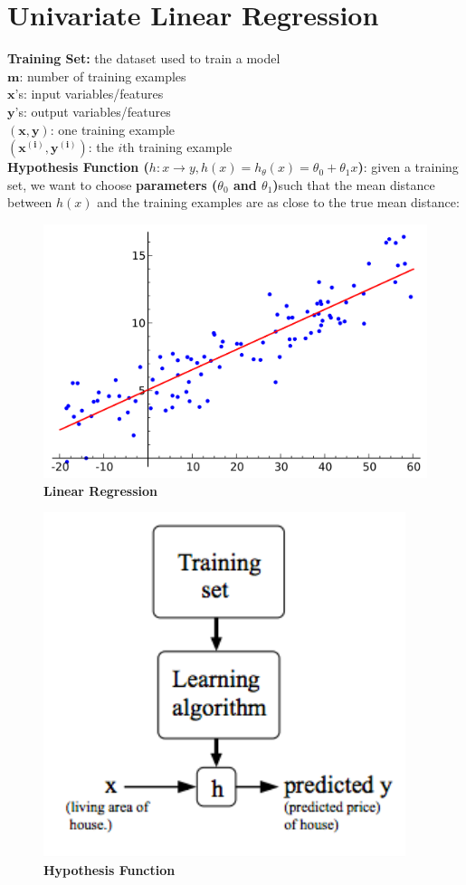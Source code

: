 \section{Univariate Linear Regression}
\noindent \textbf{Training Set:} the dataset used to train a model \\
$\bm{m}$: number of training examples \\
$\bm{x}$'s: input variables/features \\
$\bm{y}$'s: output variables/features \\
$\bm{(x,y)}$: one training example \\
$\bm{(x^{(i)}, y^{(i)})}$: the $i$th training example \\
\textbf{Hypothesis Function ($h:x\to y,h(x)=h_\theta (x)=\theta_0+\theta_1 x$)}: given a training set,
we want to choose \textbf{parameters ($\theta_0$ and $\theta_1$)}such that the mean distance between
$h(x)$ and the training examples are as close to the true mean distance:

\begin{figure}[hbt!]
    \centering
    \includegraphics[scale=0.2]{Resources/Linear_Regression.png}
    \caption*{\textbf{Linear Regression}}
\end{figure}

\begin{figure}[hbt!]
    \centering
    \includegraphics[scale=0.75]{Resources/Hypothesis_Function.png}
    \caption*{\textbf{Hypothesis Function}}
\end{figure}

